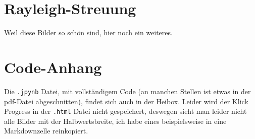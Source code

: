 \section{Rayleigh-Streuung}
Weil diese Bilder so schön sind, hier noch ein weiteres.

\section{Code-Anhang}
Die \verb|.jpynb| Datei, mit vollständigem Code (an manchen Stellen ist etwas in der pdf-Datei abgeschnitten), findet sich auch in der \href{https://heibox.uni-heidelberg.de/d/2efd363da5f84ceea685/}{Heibox}.
Leider wird der Klick Progress in der \verb|.html| Datei nicht gespeichert, deswegen sieht man leider nicht alle Bilder mit der Halbwertsbreite, ich habe eines beispielsweise in eine Markdownzelle reinkopiert.


